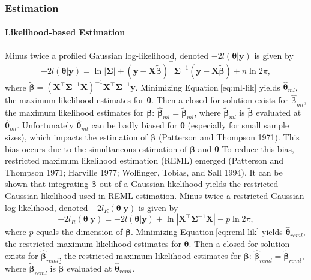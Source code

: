 \documentclass{article}
\begin{document}
\hypertarget{estimation}{%
\subsubsection{Estimation}\label{estimation}}

\hypertarget{likelihood-based-estimation}{%
\paragraph{Likelihood-based
Estimation}\label{likelihood-based-estimation}}

Minus twice a profiled Gaussian log-likelihood, denoted
\(-2l(\bm{\theta} | \mathbf{y})\) is given by
\begin{equation}\label{eq:ml-lik}
  -2l(\bm{\theta} | \mathbf{y}) = \ln{|\mathbf{\Sigma}|} + (\mathbf{y} - \mathbf{X} \tilde{\bm{\beta}})^\intercal \mathbf{\Sigma}^{-1} (\mathbf{y} - \mathbf{X} \tilde{\bm{\beta}}) + n \ln{2\pi},
\end{equation} where
\(\tilde{\bm{\beta}} = (\mathbf{X}^\intercal \mathbf{\Sigma}^{-1} \mathbf{X})^{-1} \mathbf{X}^\intercal \mathbf{\Sigma}^{-1} \mathbf{y}\).
Minimizing Equation\(~\)\ref{eq:ml-lik} yields
\(\bm{\hat{\theta}}_{ml}\), the maximum likelihood estimates for
\(\bm{\theta}\). Then a closed for solution exists for
\(\bm{\hat{\beta}}_{ml}\), the maximum likelihood estimates for
\(\bm{\beta}\): \(\bm{\hat{\beta}}_{ml} = \tilde{\bm{\beta}}_{ml}\),
where \(\tilde{\bm{\beta}}_{ml}\) is \(\tilde{\bm{\beta}}\) evaluated at
\(\bm{\hat{\theta}}_{ml}\). Unfortunately \(\bm{\hat{\theta}}_{ml}\) can
be badly biased for \(\bm{\theta}\) (especially for small sample sizes),
which impacts the estimation of \(\bm{\beta}\) (Patterson and Thompson
1971). This bias occurs due to the simultaneous estimation of
\(\bm{\beta}\) and \(\bm{\theta}\) To reduce this bias, restricted
maximum likelihood estimation (REML) emerged (Patterson and Thompson
1971; Harville 1977; Wolfinger, Tobias, and Sall 1994). It can be shown
that integrating \(\bm{\beta}\) out of a Gaussian likelihood yields the
restricted Gaussian likelihood used in REML estimation. Minus twice a
restricted Gaussian log-likelihood, denoted
\(-2l_R(\bm{\theta} | \mathbf{y})\) is given by
\begin{equation}\label{eq:reml-lik}
  -2l_R(\bm{\theta} | \mathbf{y}) = -2l(\bm{\theta} | \mathbf{y})  + \ln{|\mathbf{X}^\intercal \mathbf{\Sigma}^{-1} \mathbf{X}|} - p \ln{2\pi} ,
\end{equation} where \(p\) equals the dimension of \(\bm{\beta}\).
Minimizing Equation\(~\)\ref{eq:reml-lik} yields
\(\bm{\hat{\theta}}_{reml}\), the restricted maximum likelihood
estimates for \(\bm{\theta}\). Then a closed for solution exists for
\(\bm{\hat{\beta}}_{reml}\), the restricted maximum likelihood estimates
for \(\bm{\beta}\):
\(\bm{\hat{\beta}}_{reml} = \tilde{\bm{\beta}}_{reml}\), where
\(\tilde{\bm{\beta}}_{reml}\) is \(\tilde{\bm{\beta}}\) evaluated at
\(\bm{\hat{\theta}}_{reml}\).
\end{document}
